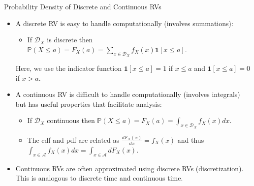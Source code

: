 \documentclass[9pt]{beamer}
\begin{document}
%
\begin{frame}{Probability Density of Discrete and Continuous RVs}

\begin{itemize}
\item A discrete RV is easy to handle computationally  (involves summations):
\begin{itemize}
\item If $\mathcal{D}_X$ is discrete then $\mathbb{P}(X\leq a)=F_X(a)=\sum_{x\in \mathcal{D}_X}f_X(x)\mathbf{1}[x\leq a]$. 
\end{itemize}
Here, we use the indicator function $\mathbf{1}[x\leq a]=1$ if $x\leq a$ and $\mathbf{1}[x\leq a]=0$ if $x> a$. 
\vspace{0.1in}
\item A continuous RV is difficult to handle computationally (involves integrals) but has useful properties that facilitate analysis:
\vspace{0.1in}
\begin{itemize}
\item If $\mathcal{D}_X$ continuous then $\mathbb{P}(X\leq a)=F_X(a)=\int_{x\in \mathcal{D}_X}f_X(x)dx$. 
\item The cdf and pdf are related as $\frac{dF_X(x)}{dx}=f_X(x)$ and thus $\int_{x\in \mathcal{A}}f_X(x)dx=\int_{x\in \mathcal{A}}dF_X(x)$.
\end{itemize}
\vspace{0.1in}
\item Continuous RVs are often approximated using discrete RVs (discretization). This is analogous to discrete time and continuous time. 

\end{itemize}


\end{frame}
\end{document}
